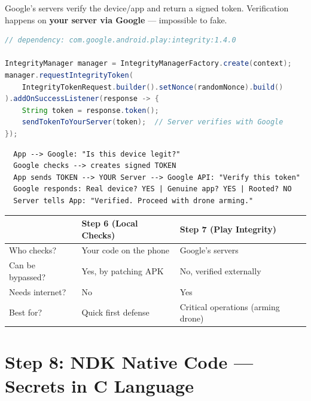 \documentclass[11pt,a4paper]{article}
\begin{document}
\begin{solutionbox}
Google's servers verify the device/app and return a signed token. Verification happens on \textbf{your server via Google} --- impossible to fake.

\begin{lstlisting}[language=Java]
// dependency: com.google.android.play:integrity:1.4.0

IntegrityManager manager = IntegrityManagerFactory.create(context);
manager.requestIntegrityToken(
    IntegrityTokenRequest.builder().setNonce(randomNonce).build()
).addOnSuccessListener(response -> {
    String token = response.token();
    sendTokenToYourServer(token);  // Server verifies with Google
});
\end{lstlisting}
\end{solutionbox}

\begin{diagrambox}
\begin{verbatim}
  App --> Google: "Is this device legit?"
  Google checks --> creates signed TOKEN
  App sends TOKEN --> YOUR Server --> Google API: "Verify this token"
  Google responds: Real device? YES | Genuine app? YES | Rooted? NO
  Server tells App: "Verified. Proceed with drone arming."
\end{verbatim}
\end{diagrambox}

\begin{notebox}
\begin{tabularx}{\textwidth}{lXX}
\toprule
& \textbf{Step 6 (Local Checks)} & \textbf{Step 7 (Play Integrity)} \\
\midrule
Who checks? & Your code on the phone & Google's servers \\
Can be bypassed? & Yes, by patching APK & No, verified externally \\
Needs internet? & No & Yes \\
Best for? & Quick first defense & Critical operations (arming drone) \\
\bottomrule
\end{tabularx}
\end{notebox}

\section{Step 8: NDK Native Code --- Secrets in C Language}
\end{document}
